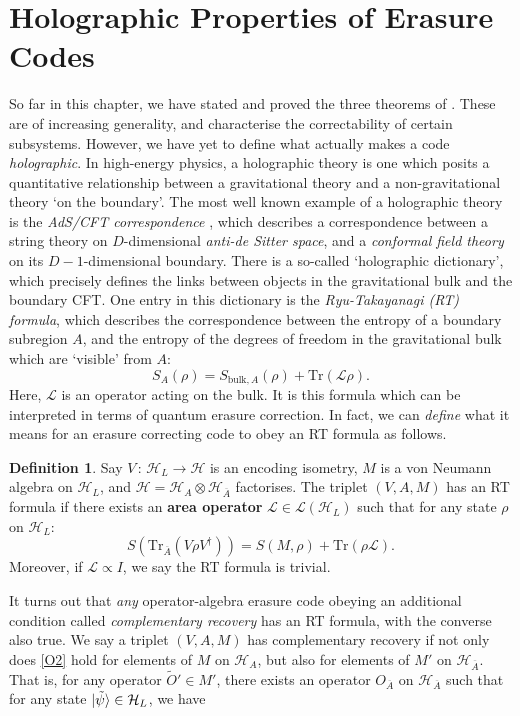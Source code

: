 \documentclass[12pt,a4paper]{report}
\numberwithin{equation}{section}
\newcommand{\ol}[1]{\overline{#1}}
\newcommand{\tr}{\text{Tr}}
\theoremstyle{definition}
\newtheorem{definition}{Definition}[section]
\theoremstyle{theorem}
\theoremstyle{theorem}
\theoremstyle{example}
\theoremstyle{definition}
\begin{document}
\section{Holographic Properties of Erasure Codes}
So far in this chapter, we have stated and proved the three theorems of \cite{Harlow}. These are of increasing generality, and characterise the correctability of certain subsystems. However, we have yet to define what actually makes a code \textit{holographic}. In high-energy physics, a holographic theory is one which posits a quantitative relationship between a gravitational theory and a non-gravitational theory `on the boundary'. The most well known example of a holographic theory is the \textit{AdS/CFT correspondence} \cite{Maldacena}, which describes a correspondence between a string theory on $D$-dimensional \textit{anti-de Sitter space}, and a \textit{conformal field theory} on its $D-1$-dimensional boundary. There is a so-called `holographic dictionary', which precisely defines the links between objects in the gravitational bulk and the boundary CFT. One entry in this dictionary is the \textit{Ryu-Takayanagi (RT) formula}, which describes the correspondence between the entropy of a boundary subregion $A$, and the entropy of the degrees of freedom in the gravitational bulk which are `visible' from $A$:
\begin{equation}
	S_{A}(\rho)=S_{\text{bulk},A}(\rho)+\tr(\mathcal{L}\rho).
\end{equation}
Here, $\mathcal{L}$ is an operator acting on the bulk. It is this formula which can be interpreted in terms of quantum erasure correction. In fact, we can \textit{define} what it means for an erasure correcting code to obey an RT formula as follows.
\begin{definition}
	Say $V\,:\,\mathcal{H}_{L}\to\mathcal{H}$ is an encoding isometry, $M$ is a von Neumann algebra on $\mathcal{H}_{L}$, and $\mathcal{H}=\mathcal{H}_{A}\otimes\mathcal{H}_{\ol{A}}$ factorises. The triplet $(V,A,M)$ has an RT formula if there exists an \textbf{area operator} $\mathcal{L}\in\mathcal{L}(\mathcal{H}_{L})$ such that for any state $\rho$ on $\mathcal{H}_{L}$:
	\begin{equation}\label{RT3}
		S(\tr_{\ol{A}}(V\rho V^{\dagger}))=S(M,\rho)+\tr(\rho\mathcal{L}).
	\end{equation}
	Moreover, if $\mathcal{L}\propto I$, we say the RT formula is trivial.
\end{definition}
It turns out that \textit{any} operator-algebra erasure code obeying an additional condition called \textit{complementary recovery} has an RT formula, with the converse also true. We say a triplet $(V,A,M)$ has complementary recovery if not only does \ref{O2} hold for elements of $M$ on $\mathcal{H}_{A}$, but also for elements of $M'$ on $\mathcal{H}_{\ol{A}}$. That is, for any operator $\tilde{O}'\in M'$, there exists an operator $O_{\ol{A}}$ on $\mathcal{H}_{\ol{A}}$ such that for any state $\ket{\tilde{\psi}}\in\mathcal{H}_{L}$, we have
\end{document}
